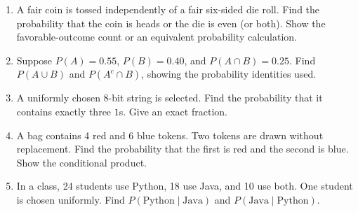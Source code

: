 \begin{enumerate}[label=\textbf{D.\arabic*.}]
    \item A fair coin is tossed independently of a fair six-sided die roll. Find the
    probability that the coin is heads or the die is even (or both). Show the
    favorable-outcome count or an equivalent probability calculation.

    \item Suppose $P(A)=0.55$, $P(B)=0.40$, and $P(A\cap B)=0.25$. Find
    $P(A\cup B)$ and $P(A^c\cap B)$, showing the probability identities used.

    \item A uniformly chosen 8-bit string is selected. Find the probability
    that it contains exactly three $1$s. Give an exact fraction.

    \item A bag contains 4 red and 6 blue tokens. Two tokens are drawn without
    replacement. Find the probability that the first is red and the second is
    blue. Show the conditional product.

    \item In a class, 24 students use Python, 18 use Java, and 10 use both.
    One student is chosen uniformly. Find
    $P(\text{Python}\mid\text{Java})$ and
    $P(\text{Java}\mid\text{Python})$.
\end{enumerate}


\thispagestyle{fancy}
